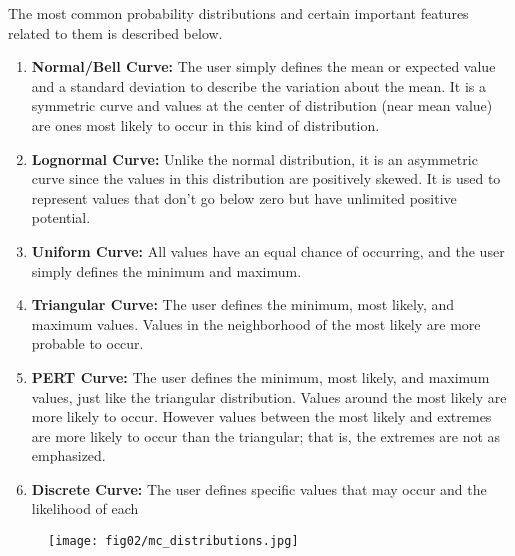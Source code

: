 The most common probability distributions \cite{MCSimulation} and certain important features related to them is described below.
\begin{enumerate}
	\item \textbf{Normal/Bell Curve:} The user simply defines the mean or expected value and a standard deviation to describe the variation about the mean. It is a symmetric curve and values at the center of distribution (near mean value) are ones most likely to occur in this kind of distribution. 
	
	\item \textbf{Lognormal Curve:} Unlike the normal distribution, it is an asymmetric curve since the values in this distribution are positively skewed. It is used to represent values that don't go below zero but have unlimited positive potential.
		
	\item \textbf{Uniform Curve:} All values have an equal chance of occurring, and the user simply defines the minimum and maximum. 
		
	\item \textbf{Triangular Curve:} The user defines the minimum, most likely, and maximum values. Values in the neighborhood of the most likely are more probable to occur. 
	
	\item \textbf{PERT Curve:}	The user defines the minimum, most likely, and maximum values, just like the triangular distribution. Values around the most likely are more likely to occur. However values between the most likely and extremes are more likely to occur than the triangular; that is, the extremes are not as emphasized. 
	
		\item \textbf{Discrete Curve:} The user defines specific values that may occur and the likelihood of each
\end{enumerate}

\begin{figure}
	\centering
	\texttt{[image: fig02/mc\_distributions.jpg]}
\end{figure}


